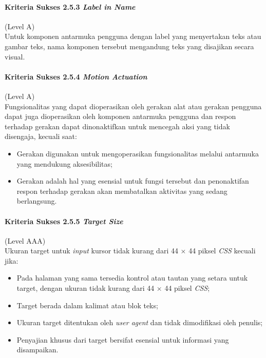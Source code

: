 \paragraph{Kriteria Sukses 2.5.3 \textit{Label in Name}}
\label{sec:kriteria_sukses_2.5.3}
(Level A)\\

Untuk komponen antarmuka pengguna dengan label yang menyertakan teks atau gambar teks, nama komponen tersebut mengandung teks yang disajikan secara visual. 

\paragraph{Kriteria Sukses 2.5.4 \textit{Motion Actuation}}
\label{sec:kriteria_sukses_2.5.4}
(Level A)\\

Fungsionalitas yang dapat dioperasikan oleh gerakan alat atau gerakan pengguna dapat juga dioperasikan oleh komponen antarmuka pengguna dan respon terhadap gerakan dapat dinonaktifkan untuk mencegah aksi yang tidak disengaja, kecuali saat:
\begin{itemize}
	\item Gerakan digunakan untuk mengoperasikan fungsionalitas melalui antarmuka yang mendukung aksesibilitas;
	\item Gerakan adalah hal yang esensial untuk fungsi tersebut dan penonaktifan respon terhadap gerakan akan membatalkan aktivitas yang sedang berlangsung.
\end{itemize}

\paragraph{Kriteria Sukses 2.5.5 \textit{Target Size}}
\label{sec:kriteria_sukses_2.5.5}
(Level AAA)\\

Ukuran target untuk \textit{input} kursor tidak kurang dari 44 $\times$ 44 piksel \textit{CSS} kecuali jika:

\begin{itemize}
	\item Pada halaman yang sama tersedia kontrol atau tautan yang setara untuk target, dengan ukuran tidak kurang dari 44 $\times$ 44 piksel \textit{CSS};  
	\item Target berada dalam kalimat atau blok teks;
	\item Ukuran target ditentukan oleh \textit{user agent} dan tidak dimodifikasi oleh penulis;
	\item Penyajian khusus dari target bersifat esensial untuk informasi yang disampaikan.
\end{itemize}

